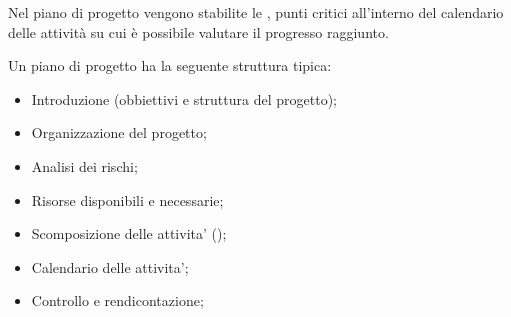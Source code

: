 Nel piano di progetto vengono stabilite le , punti critici
all'interno del calendario delle attività su cui è possibile valutare il
progresso raggiunto.

Un piano di progetto ha la seguente struttura tipica:

\begin{itemize}
  \item Introduzione (obbiettivi e struttura del progetto);
  \item Organizzazione del progetto;
  \item Analisi dei rischi;
  \item Risorse disponibili e necessarie;
  \item Scomposizione delle attivita' ();
  \item Calendario delle attivita';
  \item Controllo e rendicontazione;
\end{itemize}

